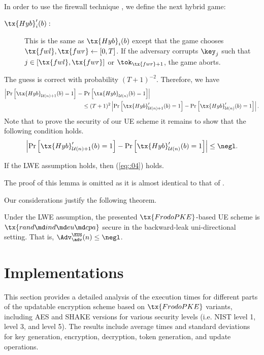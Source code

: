 \documentclass{fundam}
\begin{document}
In order to use the firewall technique \cite{jiang2020,nishimaki2022direction}, we define the next hybrid game:
\begin{description}
	\item[$\tx{Hyb}_{i}'(b):$] This is the same as $\tx{Hyb}_{i}(b)$ except that the game chooses $\tx{fwl},\tx{fwr}\gets [0,T]$. If the adversary corrupts $\key_{j}$ such that $j\in[\tx{fwl},\tx{fwr}]$ or $\tok_{\tx{fwr}+1}$, the game aborts.
\end{description}
The guess is correct with probability $(T+1)^{-2}$. Therefore, we have
%
\begin{align*}
	\left|  \Pr\left[   \tx{Hyb}_{\mathcal{U}(n)+1}(b)=1\right]\right. - & \left. \Pr\left[   \tx{Hyb}_{\mathcal{U}(n)}(b)=1  \right]  \right| \\
	&\leq (T+1)^{2}	\left|  \Pr\left[   \tx{Hyb}_{\mathcal{U}(n)+1}'(b)=1\right] - \Pr\left[   \tx{Hyb}_{\mathcal{U}(n)}'(b)=1  \right]  \right|.
\end{align*}
%
Note that to prove the security of our UE scheme it remains to show that the following condition holds.  
\begin{align}\label{eq::04}
	\left|  \Pr\left[   \tx{Hyb}_{\mathcal{U}(n)+1}'(b)=1\right] - \Pr\left[   \tx{Hyb}_{\mathcal{U}(n)}'(b)=1  \right]  \right|\leq \negl.
\end{align}

\begin{lemma}
	If the LWE assumption holds, then (\ref{eq::04}) holds.
\end{lemma}	
%
The proof of this lemma is omitted as it is almost identical to that of \cite[Lemma 5.7]{nishimaki2022direction}.

\vspace{0.5cm}
Our considerations justify the following theorem.
\begin{theorem}
	Under the LWE assumption, the presented $\tx{FrodoPKE}$-based UE scheme is $\tx{rand\md ind\md eu\md cpa}$	secure in the backward-leak uni-directional setting. That is, $\Adv_{\adv}^{\EUS}(n) \leq \negl$. 
\end{theorem}	

\section{Implementations}

\noindent This section provides a detailed analysis of the execution times for different parts of the updatable encryption scheme based on $\tx{FrodoPKE}$ variants, including AES and SHAKE versions for various security levels (i.e. NIST level 1, level 3, and level 5). The results include average times and standard deviations for key generation, encryption, decryption, token generation, and update operations. 
\end{document}
